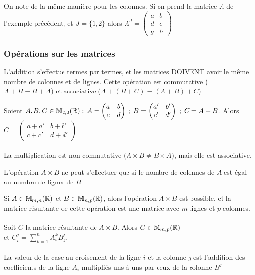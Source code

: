 \documentclass[a4paper, 11pt]{article}
\begin{document}
On note de la même manière pour les colonnes.
Si on prend la matrice $A$ de l'exemple précédent, et $J = \{1, 2\}$ alors $A^{J} = \begin{pmatrix}a&b\\d&e\\g&h\end{pmatrix}$

\newpage
\subsubsection{Opérations sur les matrices}

L'addition s'effectue termes par termes, et les matrices DOIVENT avoir le même nombre de colonnes et de lignes.
Cette opération est commutative ($A + B = B + A$) et associative ($A + (B + C) = (A + B) + C$)

Soient $A, B, C \in \mathbb{M}_{2,2}(\mathbb{R}) \; ; \; A = \begin{pmatrix}a&b\\c&d\end{pmatrix} \; ; \; B =
\begin{pmatrix}a'&b'\\c'&d'\end{pmatrix} \; ; \; C = A + B$.
Alors $C = \begin{pmatrix}a+a'&b+b'\\c+c'&d+d'\end{pmatrix}$ \\ \\

La multiplication est non commutative ($A \times B \ne B \times A$), mais elle est associative.

L'opération $A \times B$ ne peut s'effectuer que si le nombre de colonnes de $A$ est égal au nombre de lignes de $B$

Si $A \in \mathbb{M}_{m,n}(\mathbb{R})$ et $B \in \mathbb{M}_{n,p}(\mathbb{R})$, alors l'opération $A \times B$ est possible, et la matrice résultante
de cette opération est une matrice avec $m$ lignes et $p$ colonnes. \\ \\

Soit $C$ la matrice résultante de $A \times B$. Alors $C \in \mathbb{M}_{m,p}(\mathbb{R})$ \\
et $C_{i}^{j} = \sum_{k = 1}^{n} A_{i}^{k} B_{k}^{j}$. \\ \\

La valeur de la case au croisement de la ligne $i$ et la colonne $j$ est l'addition des coefficients de la ligne $A_i$
multipliés uns à uns par ceux de la colonne $B^{j}$
\end{document}
